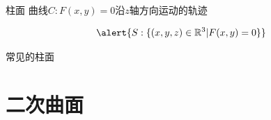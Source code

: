 \begin{frame}{柱面}
	\linespread{1.2}\pause 
	曲线$C:F(x,y)=0$沿$z$轴方向运动的轨迹\pause 
	\begin{center}
 	\end{center}\pause 
	$$\alert{S:\{(x,y,z)\in\mathbb{R}^3|F(x,y)=0\}}$$
\end{frame}

\begin{frame}{常见的柱面}
	\linespread{1.2}\pause 
	\begin{center}
 	\end{center}
\end{frame}

\section{二次曲面}


